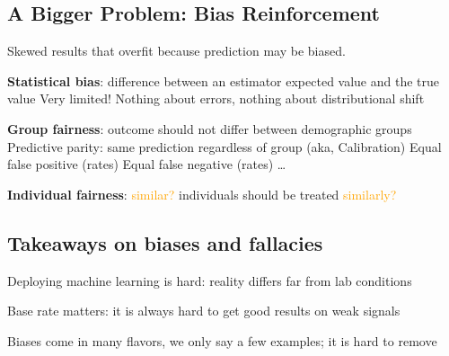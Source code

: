 \documentclass[11pt]{article}
\begin{document}
\subsection*{A Bigger Problem: Bias Reinforcement}

Skewed results that overfit because prediction may be biased. 

\textbf{Statistical bias}: difference between an estimator expected value and the true value Very limited! Nothing about errors, nothing about distributional shift

\textbf{Group fairness}: outcome should not differ between demographic groups Predictive parity: same prediction regardless of group (aka, Calibration) Equal false positive (rates)
Equal false negative (rates)
…

\textbf{Individual fairness}: \textcolor{orange}{similar?} individuals should be treated \textcolor{orange}{similarly?}

\subsection*{Takeaways on biases and fallacies}

Deploying machine learning is hard: reality differs far from lab conditions

Base rate matters: it is always hard to get good results on weak signals

Biases come in many flavors, we only say a few examples; it is hard to remove
\end{document}
